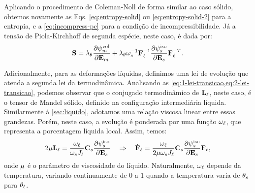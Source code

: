 \documentclass[Tese.tex]{subfiles}
\begin{document}
Aplicando o procedimento de Coleman-Noll de forma similar ao caso sólido, obtemos novamente as Eqs. \eqref{eq:entropy-solid} ou \eqref{eq:entropy-solid-2} para a entropia, e a \cref{eq:incompress-pc} para a condição de incompressibilidade. Já a tensão de Piola-Kirchhoff de segunda espécie, neste caso, é dada por:
\begin{equation}
\mathbf{S} = \lambda_{\theta}\dfrac{\partial\psi_m^\text{vol}}{\partial\mathbf{E}_m} +  \lambda_{\theta}\omega_s^{-1}\mathbf{F}_\ell^{-1}\dfrac{\partial\psi_s^\text{iso}}{\partial\mathbf{E}_s}\mathbf{F}_\ell^{-T}. \label{eq:S-mushy}
\end{equation}

Adicionalmente, para as deformações líquidas, definimos uma lei de evolução que atenda a segunda lei da termodinâmica. Analisando as \cref{eq:1-lei-transicao,eq:2-lei-transicao}, podemos observar que o conjugado termodinâmico de $\mathbf{L}_\ell$, neste caso, é o tensor de Mandel sólido, definido na configuração intermediária líquida. Similarmente à \cref{sec:liquido}, adotamos uma relação viscosa linear entre essas grandezas. Porém, neste caso, a evolução é ponderada por uma função $\omega_\ell$, que representa a porcentagem líquida local. Assim, temos:
\begin{equation}
2\mu\mathbf{L}_\ell = \dfrac{\omega_\ell}{\omega_sJ_\ell}\mathbf{C}_s\dfrac{\partial\psi_s^\text{iso}}{\partial\mathbf{E}_s} \quad\Rightarrow\quad \dot{\mathbf{F}}_\ell = \dfrac{\omega_\ell}{2\mu\omega_sJ_\ell}\mathbf{C}_s\dfrac{\partial\psi_s^\text{iso}}{\partial\mathbf{E}_s}\mathbf{F}_\ell, \label{eq:evolucao-liquida}
\end{equation}
onde $\mu$ é o parâmetro de viscosidade do líquido. Naturalmente, $\omega_\ell$ depende da temperatura, variando continuamente de $0$ a $1$ quando a temperatura varia de $\theta_s$ para $\theta_\ell$.
\end{document}
